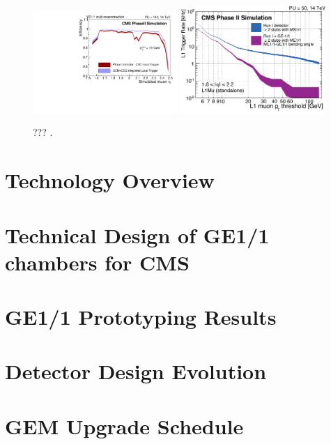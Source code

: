     \begin{figure}[h!]
      \centering
      \includegraphics[width=0.49\textwidth]{img/II-1-gem/gem-csc-efficiency.pdf}
      \includegraphics[width=0.49\textwidth]{img/II-1-gem/trigger-rate.png}
      \caption{??? \cite{Colaleo:2021453}.}
      \label{fig:II-1-gem-trigger}
    \end{figure}

  \section{Technology Overview}

  \section{Technical Design of GE1/1 chambers for CMS}

  \section{GE1/1 Prototyping Results}

  \section{Detector Design Evolution}

































  \section{GEM Upgrade Schedule}
